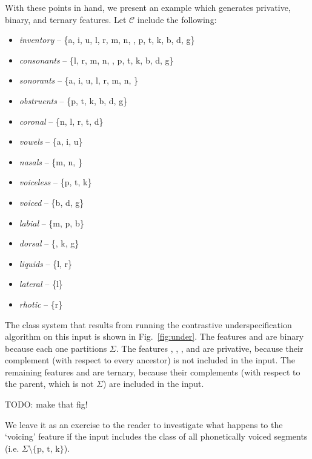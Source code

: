 \documentclass[11pt, oneside]{article}   	%
\begin{document}
\vspace{\baselineskip} With these points in hand, we present an example which generates privative, binary, and ternary features. Let $\mathcal C$ include the following: \begin{itemize}
    \item \textit{inventory} -- \{a, i, u, l, r, m, n, , p, t, k, b, d, g\}
    \item \textit{consonants} -- \{l, r, m, n, , p, t, k, b, d, g\}
    \item \textit{sonorants} -- \{a, i, u, l, r, m, n, \}
    \item \textit{obstruents} -- \{p, t, k, b, d, g\}
    \item \textit{coronal} -- \{n, l, r, t, d\}
    \item \textit{vowels} -- \{a, i, u\}
    \item \textit{nasals} -- \{m, n, \}
    \item \textit{voiceless} -- \{p, t, k\}
    \item \textit{voiced} -- \{b, d, g\}
    \item \textit{labial} -- \{m, p, b\}
    \item \textit{dorsal} -- \{, k, g\}
    \item \textit{liquids} -- \{l, r\}
    \item \textit{lateral} -- \{l\}
    \item \textit{rhotic} -- \{r\}
    \end{itemize}
The class system that results from running the contrastive underspecification algorithm on this input is shown in Fig.~\ref{fig:under}. The features  and  are binary because each one partitions $\Sigma$. The features , , ,  and  are privative, because their complement (with respect to every ancestor) is not included in the input. The remaining features  and  are ternary, because their complements (with respect to the parent, which is not $\Sigma$) are included in the input.

TODO: make that fig!

We leave it as an exercise to the reader to investigate what happens to the `voicing' feature if the input includes the class of all phonetically voiced segments (i.e. $\Sigma \setminus \text{\{p, t, k\}}$).
\end{document}
